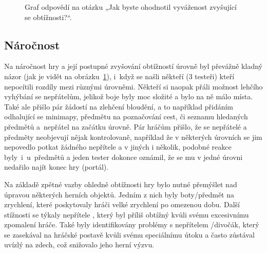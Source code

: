 \begin{figure}[ht]
    \centering
    \caption{Graf odpovědí na otázku „Jak byste ohodnotil vyváženost zvyšující se obtížnosti?“.}
    \label{fig:hodnoceni_vyvazenost}
\end{figure}

\subsection*{Náročnost}
Na náročnost hry a její postupné zvyšování obtížností úrovně byl převážně kladný názor (jak je vidět na obrázku~\ref{fig:hodnoceni_vyvazenost}), i~když se našli někteří (3 testeři) kteří nepocítili rozdíly mezi různými úrovněmi. Někteří si naopak přáli možnost lehčího vyhýbání se nepřátelům, jelikož boje byly moc složité a bylo na ně málo místa. Také ale přišlo pár žádostí na zlehčení bloudění, a to například přidáním odhalující se minimapy, předmětu na poznačování cest, či seznamu hledaných předmětů a~nepřátel na začátku úrovně. Pár hráčům přišlo, že se nepřátelé a předměty neobjevují nějak kontrolovaně, například že v některých úrovních se jim nepovedlo potkat žádného nepřítele a v jiných i několik, podobné reakce byly~i~u~předmětů a jeden tester dokonce oznámil, že se mu v jedné úrovni nedařilo najít konec hry (portál). 

Na základě zpětné vazby ohledně obtížnosti hry bylo nutné přemýšlet nad úpravou některých herních objektů. Jedním z nich byly boty/předmět na zrychlení, které poskytovaly hráči velké zrychlení po omezenou dobu. Další stížnosti se týkaly nepřítele , který byl příliš obtížný kvůli svému excesivnímu zpomalení hráče. Také byly identifikovány problémy s nepřítelem /divočák, který se zasekával na hráčské postavě kvůli svému speciálnímu útoku a často zůstával uvízlý na zdech, což snižovalo jeho herní výzvu.

